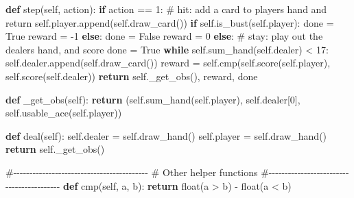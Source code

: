 \documentclass[
  letterpaper,
  DIV=11,
  numbers=noendperiod]{scrartcl}
\newenvironment{Shaded}{\begin{snugshade}}{\end{snugshade}}
\newcommand{\BuiltInTok}[1]{\textcolor[rgb]{0.00,0.23,0.31}{#1}}
\newcommand{\CommentTok}[1]{\textcolor[rgb]{0.37,0.37,0.37}{#1}}
\newcommand{\ControlFlowTok}[1]{\textcolor[rgb]{0.00,0.23,0.31}{\textbf{#1}}}
\newcommand{\DecValTok}[1]{\textcolor[rgb]{0.68,0.00,0.00}{#1}}
\newcommand{\KeywordTok}[1]{\textcolor[rgb]{0.00,0.23,0.31}{\textbf{#1}}}
\newcommand{\NormalTok}[1]{\textcolor[rgb]{0.00,0.23,0.31}{#1}}
\newcommand{\OperatorTok}[1]{\textcolor[rgb]{0.37,0.37,0.37}{#1}}
\newcommand{\VariableTok}[1]{\textcolor[rgb]{0.07,0.07,0.07}{#1}}
\begin{document}
\begin{Shaded}
\begin{Highlighting}[]
    \KeywordTok{def}\NormalTok{ step(}\VariableTok{self}\NormalTok{, action):}
        \ControlFlowTok{if}\NormalTok{ action }\OperatorTok{==} \DecValTok{1}\NormalTok{:  }\CommentTok{\# hit: add a card to players hand and return}
            \VariableTok{self}\NormalTok{.player.append(}\VariableTok{self}\NormalTok{.draw\_card())}
            \ControlFlowTok{if} \VariableTok{self}\NormalTok{.is\_bust(}\VariableTok{self}\NormalTok{.player):}
\NormalTok{                done }\OperatorTok{=} \VariableTok{True}
\NormalTok{                reward }\OperatorTok{=} \OperatorTok{{-}}\DecValTok{1}
            \ControlFlowTok{else}\NormalTok{:}
\NormalTok{                done }\OperatorTok{=} \VariableTok{False}
\NormalTok{                reward }\OperatorTok{=} \DecValTok{0}
        \ControlFlowTok{else}\NormalTok{:  }\CommentTok{\# stay: play out the dealers hand, and score}
\NormalTok{            done }\OperatorTok{=} \VariableTok{True}
            \ControlFlowTok{while} \VariableTok{self}\NormalTok{.sum\_hand(}\VariableTok{self}\NormalTok{.dealer) }\OperatorTok{\textless{}} \DecValTok{17}\NormalTok{:}
                \VariableTok{self}\NormalTok{.dealer.append(}\VariableTok{self}\NormalTok{.draw\_card())}
\NormalTok{            reward }\OperatorTok{=} \VariableTok{self}\NormalTok{.}\BuiltInTok{cmp}\NormalTok{(}\VariableTok{self}\NormalTok{.score(}\VariableTok{self}\NormalTok{.player), }\VariableTok{self}\NormalTok{.score(}\VariableTok{self}\NormalTok{.dealer))}
        \ControlFlowTok{return} \VariableTok{self}\NormalTok{.\_get\_obs(), reward, done}

    \KeywordTok{def}\NormalTok{ \_get\_obs(}\VariableTok{self}\NormalTok{):}
        \ControlFlowTok{return}\NormalTok{ (}\VariableTok{self}\NormalTok{.sum\_hand(}\VariableTok{self}\NormalTok{.player), }\VariableTok{self}\NormalTok{.dealer[}\DecValTok{0}\NormalTok{], }\VariableTok{self}\NormalTok{.usable\_ace(}\VariableTok{self}\NormalTok{.player))}

    \KeywordTok{def}\NormalTok{ deal(}\VariableTok{self}\NormalTok{):}
        \VariableTok{self}\NormalTok{.dealer }\OperatorTok{=} \VariableTok{self}\NormalTok{.draw\_hand()}
        \VariableTok{self}\NormalTok{.player }\OperatorTok{=} \VariableTok{self}\NormalTok{.draw\_hand()}
        \ControlFlowTok{return} \VariableTok{self}\NormalTok{.\_get\_obs()}
    
    \CommentTok{\#{-}{-}{-}{-}{-}{-}{-}{-}{-}{-}{-}{-}{-}{-}{-}{-}{-}{-}{-}{-}{-}{-}{-}{-}{-}{-}{-}{-}{-}{-}{-}{-}{-}{-}{-}{-}{-}{-}{-}{-}{-}{-}}
    \CommentTok{\# Other helper functions}
    \CommentTok{\#{-}{-}{-}{-}{-}{-}{-}{-}{-}{-}{-}{-}{-}{-}{-}{-}{-}{-}{-}{-}{-}{-}{-}{-}{-}{-}{-}{-}{-}{-}{-}{-}{-}{-}{-}{-}{-}{-}{-}{-}{-}{-}}
    \KeywordTok{def} \BuiltInTok{cmp}\NormalTok{(}\VariableTok{self}\NormalTok{, a, b):}
        \ControlFlowTok{return} \BuiltInTok{float}\NormalTok{(a }\OperatorTok{\textgreater{}}\NormalTok{ b) }\OperatorTok{{-}} \BuiltInTok{float}\NormalTok{(a }\OperatorTok{\textless{}}\NormalTok{ b)}
    

\end{Highlighting}
\end{Shaded}
\end{document}
